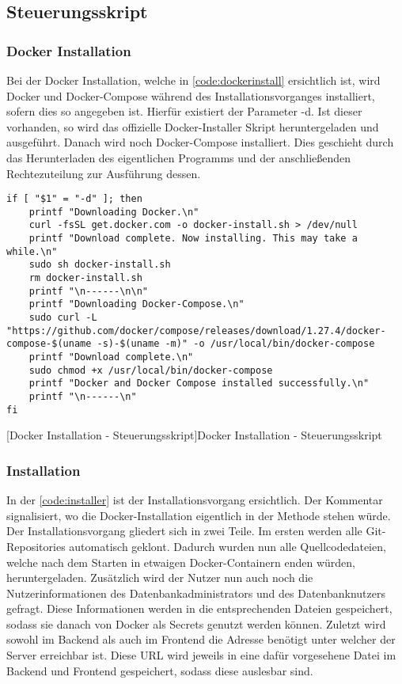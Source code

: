 \subsection{Steuerungsskript}
\subsubsection{Docker Installation}

Bei der Docker Installation, welche in \autoref{code:dockerinstall} ersichtlich ist, wird Docker und Docker-Compose während des Installationsvorganges installiert, sofern dies so angegeben ist. Hierfür existiert der Parameter -d. Ist dieser vorhanden, so wird das offizielle Docker-Installer Skript heruntergeladen und ausgeführt. Danach wird noch Docker-Compose installiert. Dies geschieht durch das Herunterladen des eigentlichen Programms und der anschließenden Rechtezuteilung zur Ausführung dessen.

\begin{verbatim}
if [ "$1" = "-d" ]; then
	printf "Downloading Docker.\n"
	curl -fsSL get.docker.com -o docker-install.sh > /dev/null
	printf "Download complete. Now installing. This may take a while.\n"
	sudo sh docker-install.sh
	rm docker-install.sh
	printf "\n------\n\n"
	printf "Downloading Docker-Compose.\n"
	sudo curl -L "https://github.com/docker/compose/releases/download/1.27.4/docker-compose-$(uname -s)-$(uname -m)" -o /usr/local/bin/docker-compose
	printf "Download complete.\n"
	sudo chmod +x /usr/local/bin/docker-compose
	printf "Docker and Docker Compose installed successfully.\n"
	printf "\n------\n"
fi
\end{verbatim}
[Docker Installation - Steuerungsskript]{Docker Installation - Steuerungsskript}
\label{code:dockerinstall}

\subsubsection{Installation}

In der \autoref{code:installer} ist der Installationsvorgang ersichtlich. Der Kommentar signalisiert, wo die Docker-Installation eigentlich in der Methode stehen würde. Der Installationsvorgang gliedert sich in zwei Teile. Im ersten werden alle Git-Repositories automatisch geklont. Dadurch wurden nun alle Quellcodedateien, welche nach dem Starten in etwaigen Docker-Containern enden würden, heruntergeladen. Zusätzlich wird der Nutzer nun auch noch die Nutzerinformationen des Datenbankadministrators und des Datenbanknutzers gefragt. Diese Informationen werden in die entsprechenden Dateien gespeichert, sodass sie danach von Docker als Secrets genutzt werden können. Zuletzt wird sowohl im Backend als auch im Frontend die Adresse benötigt unter welcher der Server erreichbar ist. Diese URL wird jeweils in eine dafür vorgesehene Datei im Backend und Frontend gespeichert, sodass diese auslesbar sind.

